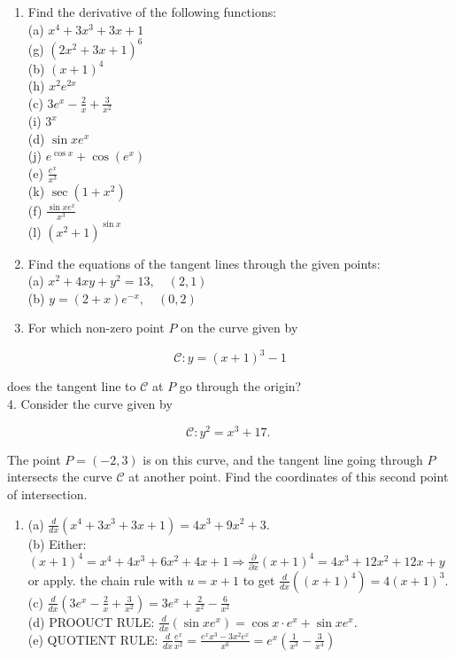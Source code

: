 \documentclass[10pt]{article}
\begin{document}
\begin{enumerate}
  \item Find the derivative of the following functions:\\
(a) $x^{4}+3 x^{3}+3 x+1$\\
(g) $\left(2 x^{2}+3 x+1\right)^{6}$\\
(b) $(x+1)^{4}$\\
(h) $x^{2} e^{2 x}$\\
(c) $3 e^{x}-\frac{2}{x}+\frac{3}{x^{2}}$\\
(i) $3^{x}$\\
(d) $\sin x e^{x}$\\
(j) $e^{\cos x}+\cos \left(e^{x}\right)$\\
(e) $\frac{e^{x}}{x^{3}}$\\
(k) $\sec \left(1+x^{2}\right)$\\
(f) $\frac{\sin x e^{x}}{x^{3}}$\\
(l) $\left(x^{2}+1\right)^{\sin x}$
  \item Find the equations of the tangent lines through the given points:\\
(a) $x^{2}+4 x y+y^{2}=13, \quad(2,1)$\\
(b) $y=(2+x) e^{-x}, \quad(0,2)$
  \item For which non-zero point $P$ on the curve given by
\end{enumerate}

$$
\mathcal{C}: y=(x+1)^{3}-1
$$

does the tangent line to $\mathcal{C}$ at $P$ go through the origin?\\
4. Consider the curve given by

$$
\mathcal{C}: y^{2}=x^{3}+17 \text {. }
$$

The point $P=(-2,3)$ is on this curve, and the tangent line going through $P$ intersects the curve $\mathcal{C}$ at another point. Find the coordinates of this second point of intersection.

\begin{enumerate}
  \item (a) $\frac{d}{d x}\left(x^{4}+3 x^{3}+3 x+1\right)=4 x^{3}+9 x^{2}+3$.\\
(b) Either: $(x+1)^{4}=x^{4}+4 x^{3}+6 x^{2}+4 x+1 \Rightarrow \frac{\partial}{\partial x}(x+1)^{4}=4 x^{3}+12 x^{2}+12 x+y$ or apply. the chain rule with $u=x+1$ to get $\frac{d}{d x}\left((x+1)^{4}\right)=4(x+1)^{3}$.\\
(c) $\frac{d}{d x}\left(3 e^{x}-\frac{2}{x}+\frac{3}{x^{2}}\right)=3 e^{x}+\frac{2}{x^{2}}-\frac{6}{x^{2}}$\\
(d) PROOUCT RULE: $\frac{d}{d x}\left(\sin x e^{x}\right)=\cos x \cdot e^{x}+\sin x e^{x}$.\\
(e) QUOTIENT RULE: $\frac{d}{d x} \frac{e^{x}}{x^{2}}=\frac{e^{x} x^{3}-3 x^{2} e^{x}}{x^{6}}=e^{x}\left(\frac{1}{x^{3}}-\frac{3}{x^{4}}\right)$
\end{enumerate}
\end{document}
